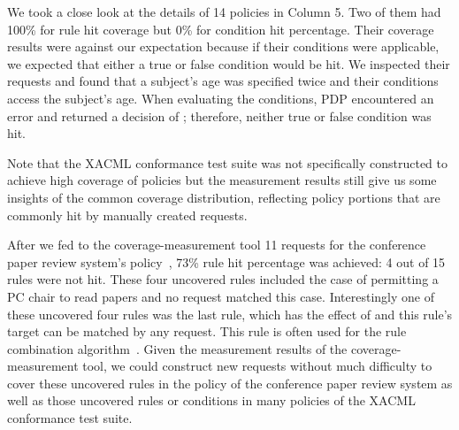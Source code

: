 We took a close look at the details of 14 policies in Column 5. Two
of them had 100\% for rule hit coverage but 0\% for condition hit
percentage. Their coverage results were against our expectation
because if their conditions were applicable, we expected that either
a true or false condition would be hit. We inspected their requests
and found that a subject's age was specified twice and their
conditions access the subject's age. When evaluating the conditions,
PDP encountered an error and returned a decision of
; therefore, neither true or false condition
was hit.

Note that the XACML conformance test suite was not specifically
constructed to achieve high coverage of policies but the
measurement results still give us some insights of the common
coverage distribution, reflecting policy portions that are
commonly hit by manually created requests.

After we fed to the coverage-measurement tool 11 requests for the
conference paper review system's policy~\cite{zhang04:synthesis},
73\% rule hit percentage was achieved: 4 out of 15 rules were not
hit. These four uncovered rules included the case of permitting a PC
chair to read papers and no request matched this case. Interestingly
one of these uncovered four rules was the last rule, which has the
effect of  and this rule's target can be matched by any
request. This rule is often used for the 
rule combination algorithm~\cite{oasis05:xacml}. Given the
measurement results of the coverage-measurement tool, we could
construct new requests without much difficulty to cover these
uncovered rules in the policy of the conference paper review system
as well as those uncovered rules or conditions in many policies of
the XACML conformance test suite.

